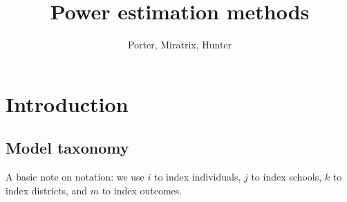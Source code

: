 \documentclass[12pt]{article}
\begin{document}
\author{Porter, Miratrix, Hunter}
\title{Power estimation methods}

\maketitle

\tableofcontents 

\newpage
\section{Introduction}


\subsection{Model taxonomy}

A basic note on notation: we use $i$ to index individuals, $j$ to index schools, $k$ to index districts, and $m$ to index outcomes.
\end{document}
